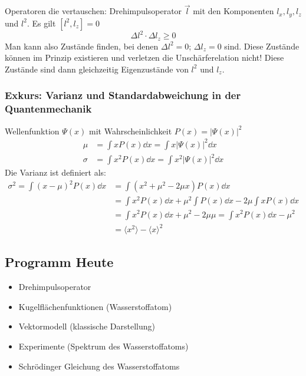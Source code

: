 Operatoren die vertauschen: Drehimpulsoperator $ \vec{l} $ mit den Komponenten $ l_x, l_y, l_z $ und $ l^2 $. Es gilt $ \left[l^2, l_z\right] = 0 $
\begin{equation*}
\Delta l^2 \cdot \Delta l_z \ge 0
\end{equation*}
Man kann also Zustände finden, bei denen $ \Delta l^2 = 0 $; $ \Delta l_z = 0 $ sind. Diese Zustände können im Prinzip existieren und verletzen die Unschärferelation nicht! Diese Zustände sind dann gleichzeitig Eigenzustände von $ l^2 $ und $ l_z $.

\subsubsection*{Exkurs: Varianz und Standardabweichung in der Quantenmechanik}

Wellenfunktion $ \Psi(x) $ mit Wahrscheinlichkeit $ P(x) = |\Psi(x)|^2 $
\begin{align*}
\mu &= \int x P(x) \dd x = \int x | \Psi(x) | ^2 \dd x \\
\sigma   &= \int x^2 P(x) \dd x = \int x^2 | \Psi(x) | ^2 \dd x
\end{align*}
Die Varianz ist definiert als:
\begin{align*}
\sigma^2 = \int (x - \mu)^2 P(x) \dd x &= \int (x^2 + \mu^2 - 2 \mu x) P(x) \dd x \\
&= \int x^2 P(x) \dd x + \mu^2 \int P(x) \dd x - 2 \mu \int x P(x) \dd x\\
&= \int x^2 P(x) \dd x + \mu^2 - 2 \mu \mu = \int x^2 P(x) \dd x - \mu^2 \\
&= \langle x ^2 \rangle - \langle x \rangle ^2
\end{align*}


\subsection*{Programm Heute}

\begin{itemize}
	\item Drehimpulsoperator
	\item Kugelflächenfunktionen (Wasserstoffatom)
	\item Vektormodell (klassische Darstellung)\\
	\item Experimente (Spektrum des Wasserstoffatoms)
	\item Schrödinger Gleichung des Wasserstoffatoms
\end{itemize}

